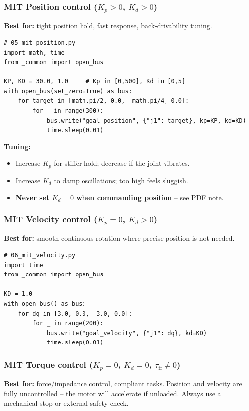 \documentclass[11pt,a4paper]{article}
\begin{document}
\subsubsection{MIT Position control ($K_p>0$, $K_d>0$)}
\textbf{Best for:} tight position hold, fast response, back-drivability tuning.

\begin{lstlisting}
# 05_mit_position.py
import math, time
from _common import open_bus

KP, KD = 30.0, 1.0     # Kp in [0,500], Kd in [0,5]
with open_bus(set_zero=True) as bus:
    for target in [math.pi/2, 0.0, -math.pi/4, 0.0]:
        for _ in range(300):
            bus.write("goal_position", {"j1": target}, kp=KP, kd=KD)
            time.sleep(0.01)
\end{lstlisting}

\noindent\textbf{Tuning:}
\begin{itemize}
  \item Increase $K_p$ for stiffer hold; decrease if the joint vibrates.
  \item Increase $K_d$ to damp oscillations; too high feels sluggish.
  \item \textbf{Never set $K_d = 0$ when commanding position} -- see PDF note.
\end{itemize}

\subsubsection{MIT Velocity control ($K_p=0$, $K_d>0$)}
\textbf{Best for:} smooth continuous rotation where precise position is not needed.

\begin{lstlisting}
# 06_mit_velocity.py
import time
from _common import open_bus

KD = 1.0
with open_bus() as bus:
    for dq in [3.0, 0.0, -3.0, 0.0]:
        for _ in range(200):
            bus.write("goal_velocity", {"j1": dq}, kd=KD)
            time.sleep(0.01)
\end{lstlisting}

\subsubsection{MIT Torque control ($K_p=0$, $K_d=0$, $\tau_{\text{ff}}\neq0$)}
\textbf{Best for:} force/impedance control, compliant tasks.
Position and velocity are fully uncontrolled -- the motor will accelerate
if unloaded.  Always use a mechanical stop or external safety check.
\end{document}
